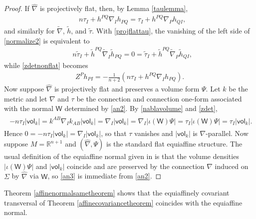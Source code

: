 \documentclass [leqno, 10pt]{amsart}
\theoremstyle{definition}
\numberwithin{equation}{section}
\newcommand{\imt}{\iota}
\newcommand{\vol}{\mathsf{vol}}
\newcommand{\nm}{\mathsf{W}}
\newcommand{\hnabla}{\widehat{\nabla}}
\newcommand{\tnabla}{\tilde{\nabla}}
\newcommand{\rea}{\mathbb R}
\begin{document}
\begin{proof}
If $\hnabla$ is projectively flat, then, by Lemma \ref{taulemma}, 
\begin{align}\label{projflattau}
&n\tau_{I} + h^{PQ}\nabla_{I}h_{PQ} = \tau_{I} + h^{PQ}\nabla_{P}h_{QI},
\end{align}
and similarly for $\tnabla$, $\tilde{h}$, and $\tilde{\tau}$. With \eqref{projflattau}, the vanishing of the left side of \eqref{normalize2} is equivalent to
\begin{align}\label{zdet0}
&n\tilde{\tau}_{I} +  \tilde{h}^{PQ}\tnabla_{I}\tilde{h}_{PQ} = 0 = \tilde{\tau}_{I} + \tilde{h}^{PQ}\tnabla_{P}\tilde{h}_{QI},
\end{align}
while \eqref{zdetnonflat} becomes
\begin{align}\label{zdet}
 &Z^{P}h_{PI} =  -\tfrac{1}{n+2}\left(n\tau_{I} + h^{PQ}\nabla_{I}h_{PQ}\right).&
\end{align}
Now suppose $\hnabla$ is projectively flat and preserves a volume form $\Psi$. 
Let $k$ be the metric and let $\nabla$ and $\tau$ be the connection and connection one-form associated with the normal $\nm$ determined by \eqref{an2}.
By \eqref{nablavolume} and \eqref{zdet}, 
\begin{align}
\begin{split}
-n\tau_{I}|\vol_{k}| = k^{AB}\nabla_{I}k_{AB}|\vol_{k}| = \nabla_{I}|\vol_{k}| = \nabla_{I}|\imt(\nm)\Psi| = \tau_{I}|\imt(\nm)\Psi| = \tau_{I}|\vol_{k}|.
\end{split}
\end{align}
Hence $ 0 = -n\tau_{I}|\vol_{k}|  = \nabla_{I}|\vol_{k}|$, so that $\tau$ vanishes and $|\vol_{k}|$ is $\nabla$-parallel. 
Now suppose $M = \rea^{n+1}$ and $(\hnabla, \Psi)$ is the standard flat equiaffine structure.
The usual definition of the equiaffine normal given in \cite{Nomizu-Sasaki} is that the volume densities $|\imt(\nm)\Psi|$ and $|\vol_{k}|$ coincide and are preserved by the connection $\nabla$ induced on $\Sigma$ by $\hnabla$ via $\nm$, so \eqref{an3} is immediate from \eqref{an2}.
\end{proof}

Theorem \ref{affinenormalsametheorem} shows that the equiaffinely covariant transversal of Theorem \ref{affinecovariancetheorem} coincides with the equiaffine normal.
\end{document}
